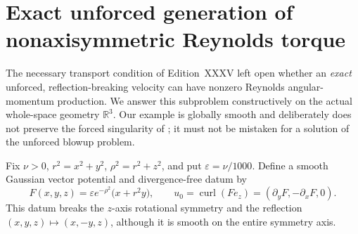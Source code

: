 
\section{Exact unforced generation of nonaxisymmetric Reynolds torque}
\label{sec:xxxvii-exact-unforced-torque}

The necessary transport condition of Edition~XXXV left open
whether an \emph{exact} unforced, reflection-breaking velocity
can have nonzero Reynolds angular-momentum production.
We answer this subproblem constructively on the actual
whole-space geometry $\mathbb R^3$. Our example is globally
smooth and deliberately does not preserve the forced
singularity of \cite{openai2026}; it must not be
mistaken for a solution of the unforced blowup problem.

Fix $\nu>0$, $r^2=x^2+y^2$, $\rho^2=r^2+z^2$,
and put $\varepsilon=\nu/1000$. Define a smooth Gaussian
vector potential and divergence-free datum by
\begin{equation}\label{eq:xxxvii-datum}
F(x,y,z)=\varepsilon e^{-\rho^2}
\bigl(x+r^2y\bigr),\qquad
u_0=\operatorname{curl}(F e_z)
=(\partial_yF,-\partial_xF,0).
\end{equation}
This datum breaks the $z$-axis rotational symmetry
and the reflection $(x,y,z)\mapsto(x,-y,z)$,
although it is smooth on the entire symmetry axis.

